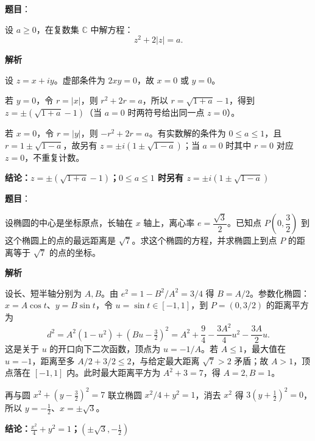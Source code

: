 \begin{answer}

\textbf{题目}：

设 $a\ge0$，在复数集 $\mathbb C$ 中解方程：
\nopagebreak[4]
\[
z^2+2|z|=a.
\]

\textbf{解析}

设 $z=x+iy$。虚部条件为 $2xy=0$，故 $x=0$ 或 $y=0$。

若 $y=0$，令 $r=|x|$，则 $r^2+2r=a$，所以 $r=\sqrt{1+a}-1$，得到 $z=\pm(\sqrt{1+a}-1)$（当 $a=0$ 时两符号给出同一点 $z=0$）。

若 $x=0$，令 $r=|y|$，则 $-r^2+2r=a$。有实数解的条件为 $0\le a\le1$，且 $r=1\pm\sqrt{1-a}$，故另有 $z=\pm i(1\pm\sqrt{1-a})$；当 $a=0$ 时其中 $r=0$ 对应 $z=0$，不重复计数。

\textbf{结论：$z=\pm(\sqrt{1+a}-1)$；$0\le a\le1$ 时另有 $z=\pm i(1\pm\sqrt{1-a})$}


\end{answer}
\begin{answer}

\textbf{题目}：

设椭圆的中心是坐标原点，长轴在 $x$ 轴上，离心率 $e=\dfrac{\sqrt3}{2}$。已知点 $P\left(0,\dfrac32\right)$ 到这个椭圆上的点的最远距离是 $\sqrt7$。求这个椭圆的方程，并求椭圆上到点 $P$ 的距离等于 $\sqrt7$ 的点的坐标。

\textbf{解析}

设长、短半轴分别为 $A,B$。由 $e^2=1-B^2/A^2=3/4$ 得 $B=A/2$。参数化椭圆：$x=A\cos t$、$y=B\sin t$，令 $u=\sin t\in[-1,1]$，到 $P=(0,3/2)$ 的距离平方为
\nopagebreak[4]
\[
d^2=A^2(1-u^2)+(Bu-\tfrac32)^2
=A^2+\frac94-\frac{3A^2}{4}u^2-\frac{3A}{2}u.
\]
这是关于 $u$ 的开口向下二次函数，顶点为 $u=-1/A$。若 $A\le1$，最大值在 $u=-1$，距离至多 $A/2+3/2\le2$，与给定最大距离 $\sqrt7>2$ 矛盾；故 $A>1$，顶点落在 $[-1,1]$ 内。此时最大距离平方为 $A^2+3=7$，得 $A=2,B=1$。

再与圆 $x^2+(y-\frac32)^2=7$ 联立椭圆 $x^2/4+y^2=1$，消去 $x^2$ 得 $3(y+\frac12)^2=0$，所以 $y=-\frac12$、$x=\pm\sqrt3$。

\textbf{结论：$\frac{x^2}{4}+y^2=1$；$(\pm\sqrt3,-\frac12)$}


\end{answer}